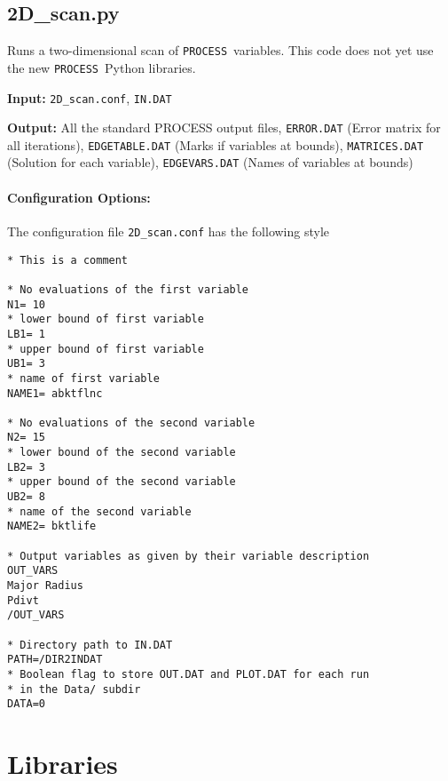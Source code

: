 \documentclass[11pt,a4paper]{report}
\newcommand{\indat}{\mbox{\texttt{IN.DAT}}}
\newcommand{\process}{\mbox{\texttt{PROCESS}}}
\begin{document}
\subsection{2D\_scan.py}


Runs a two-dimensional scan of \process\ variables. This code does not yet use
the new \process\ Python libraries.

\begin{description}
\item{\textbf{Input:}}
 \texttt{2D\_scan.conf}, \indat\
                                
\item{\textbf{Output:}} All the standard PROCESS output files,
  \texttt{ERROR.DAT} (Error matrix for all iterations), \texttt{EDGETABLE.DAT}
  (Marks if variables at bounds), \texttt{MATRICES.DAT} (Solution for each
  variable), \texttt{EDGEVARS.DAT} (Names of variables at bounds)
\end{description}

\paragraph{Configuration Options:}

The configuration file \texttt{2D\_scan.conf} has the following style
\begin{framed}
\begin{verbatim}
* This is a comment

* No evaluations of the first variable
N1= 10
* lower bound of first variable
LB1= 1
* upper bound of first variable
UB1= 3
* name of first variable
NAME1= abktflnc

* No evaluations of the second variable
N2= 15
* lower bound of the second variable
LB2= 3
* upper bound of the second variable
UB2= 8
* name of the second variable
NAME2= bktlife

* Output variables as given by their variable description
OUT_VARS
Major Radius
Pdivt
/OUT_VARS

* Directory path to IN.DAT
PATH=/DIR2INDAT
* Boolean flag to store OUT.DAT and PLOT.DAT for each run
* in the Data/ subdir
DATA=0
\end{verbatim}
\end{framed}

\section{Libraries}
\label{sec:py_lib}
\end{document}
